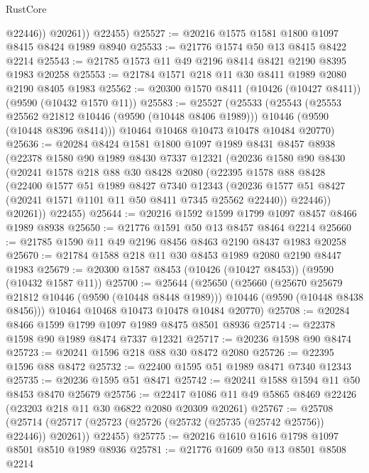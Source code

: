 \begin{lexlean}{RustCore}
\begin{coremodule}
              @22446))
          @20261))
      @22455)
@25527 := @20216 @1575 @1581 @1800 @1097 @8415 @8424 @1989 @8940
@25533 := @21776 @1574 @50 @13 @8415 @8422 @2214
@25543 := @21785 @1573 @11 @49 @2196 @8414 @8421 @2190 @8395 @1983 @20258
@25553 := @21784 @1571 @218 @11 @30 @8411 @1989 @2080 @2190 @8405 @1983
@25562 := @20300 @1570 @8411 (@10426 (@10427 @8411)) (@9590 (@10432 @1570 @11))
@25583 := @25527
    (@25533
      (@25543
        (@25553 @25562 @21812 @10446 (@9590 (@10448 @8406 @1989)))
        @10446
        (@9590 (@10448 @8396 @8414)))
      @10464
      @10468
      @10473
      @10478
      @10484
      @20770)
@25636 := @20284
    @8424
    @1581
    @1800
    @1097
    @1989
    @8431
    @8457
    @8938
    (@22378
      @1580
      @90
      @1989
      @8430
      @7337
      @12321
      (@20236
        @1580
        @90
        @8430
        (@20241
          @1578
          @218
          @88
          @30
          @8428
          @2080
          (@22395
            @1578
            @88
            @8428
            (@22400
              @1577
              @51
              @1989
              @8427
              @7340
              @12343
              (@20236 @1577 @51 @8427 (@20241 @1571 @1101 @11 @50 @8411 @7345 @25562 @22440))
              @22446))
          @20261))
      @22455)
@25644 := @20216 @1592 @1599 @1799 @1097 @8457 @8466 @1989 @8938
@25650 := @21776 @1591 @50 @13 @8457 @8464 @2214
@25660 := @21785 @1590 @11 @49 @2196 @8456 @8463 @2190 @8437 @1983 @20258
@25670 := @21784 @1588 @218 @11 @30 @8453 @1989 @2080 @2190 @8447 @1983
@25679 := @20300 @1587 @8453 (@10426 (@10427 @8453)) (@9590 (@10432 @1587 @11))
@25700 := @25644
    (@25650
      (@25660
        (@25670 @25679 @21812 @10446 (@9590 (@10448 @8448 @1989)))
        @10446
        (@9590 (@10448 @8438 @8456)))
      @10464
      @10468
      @10473
      @10478
      @10484
      @20770)
@25708 := @20284 @8466 @1599 @1799 @1097 @1989 @8475 @8501 @8936
@25714 := @22378 @1598 @90 @1989 @8474 @7337 @12321
@25717 := @20236 @1598 @90 @8474
@25723 := @20241 @1596 @218 @88 @30 @8472 @2080
@25726 := @22395 @1596 @88 @8472
@25732 := @22400 @1595 @51 @1989 @8471 @7340 @12343
@25735 := @20236 @1595 @51 @8471
@25742 := @20241 @1588 @1594 @11 @50 @8453 @8470 @25679
@25756 := @22417 @1086 @11 @49 @5865 @8469 @22426 (@23203 @218 @11 @30 @6822 @2080 @20309 @20261)
@25767 := @25708
    (@25714 (@25717 (@25723 (@25726 (@25732 (@25735 (@25742 @25756)) @22446)) @20261)) @22455)
@25775 := @20216 @1610 @1616 @1798 @1097 @8501 @8510 @1989 @8936
@25781 := @21776 @1609 @50 @13 @8501 @8508 @2214

\end{coremodule}
\end{lexlean}
